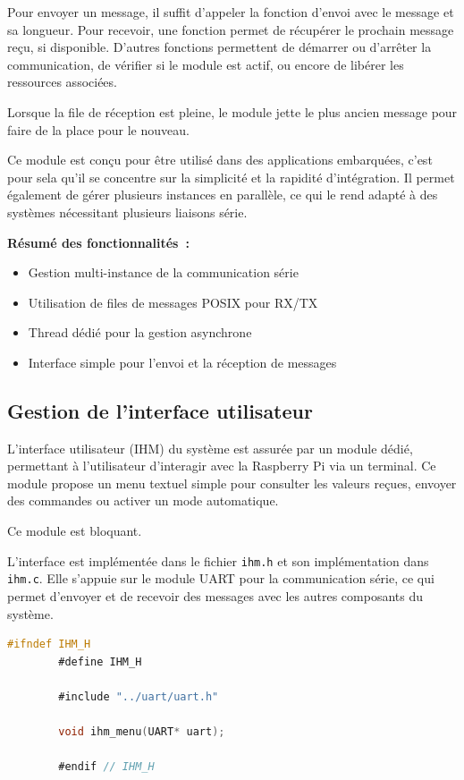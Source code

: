     Pour envoyer un message, il suffit d'appeler la fonction d'envoi avec le message et sa longueur. Pour recevoir, une fonction permet de récupérer le prochain message reçu, si disponible. D'autres fonctions permettent de démarrer ou d'arrêter la communication, de vérifier si le module est actif, ou encore de libérer les ressources associées. 

    Lorsque la file de réception est pleine, le module jette le plus ancien message pour faire de la place pour le nouveau. 

    Ce module est conçu pour être utilisé dans des applications embarquées, c'est pour sela qu'il se concentre sur la simplicité et la rapidité d'intégration. Il permet également de gérer plusieurs instances en parallèle, ce qui le rend adapté à des systèmes nécessitant plusieurs liaisons série.

    \vspace{0.5em}
    \noindent
    \textbf{Résumé des fonctionnalités~:}
    \begin{itemize}
        \item Gestion multi-instance de la communication série
        \item Utilisation de files de messages POSIX pour RX/TX
        \item Thread dédié pour la gestion asynchrone
        \item Interface simple pour l'envoi et la réception de messages
    \end{itemize}

\subsection{Gestion de l'interface utilisateur}

    L'interface utilisateur (IHM) du système est assurée par un module dédié, permettant à l'utilisateur d'interagir avec la Raspberry Pi via un terminal. Ce module propose un menu textuel simple pour consulter les valeurs reçues, envoyer des commandes ou activer un mode automatique.

    Ce module est bloquant.

    L'interface est implémentée dans le fichier \texttt{ihm.h} et son implémentation dans \texttt{ihm.c}. Elle s'appuie sur le module UART pour la communication série, ce qui permet d'envoyer et de recevoir des messages avec les autres composants du système.

    \begin{lstlisting}[language=C, caption={Interface du module IHM}, label={lst:ihmheader}]
        #ifndef IHM_H
        #define IHM_H

        #include "../uart/uart.h"

        void ihm_menu(UART* uart);

        #endif // IHM_H
    \end{lstlisting}

